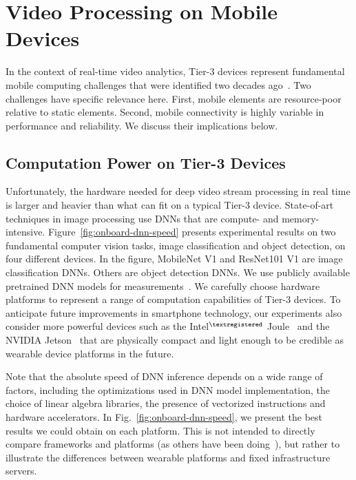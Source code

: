 \section{Video Processing on Mobile Devices}
\label{bw:challenges}

In the context of real-time video analytics, Tier-3 devices represent
fundamental mobile computing challenges that were identified two decades
ago~\cite{Satya1996}.  Two challenges have specific relevance here. First,
mobile elements are resource-poor relative to static elements.  Second, mobile
connectivity is highly variable in performance and reliability.  We discuss
their implications below.


\subsection{Computation Power on Tier-3 Devices}
\label{bw:payload}

Unfortunately, the hardware needed for deep video stream processing in real time
is larger and heavier than what can fit on a typical Tier-3 device. State-of-art
techniques in image processing use DNNs that are compute- and memory-intensive.
Figure~\ref{fig:onboard-dnn-speed} presents experimental results on two
fundamental computer vision tasks, image classification and object detection, on
four different devices. In the figure, MobileNet V1 and ResNet101 V1 are image
classification DNNs. Others are object detection DNNs. We use publicly available
pretrained DNN models for measurements~\cite{tfod2019}. We carefully choose
hardware platforms to represent a range of computation capabilities of Tier-3
devices. To anticipate future improvements in smartphone technology, our
experiments also consider more powerful devices such as the
Intel$^{\tiny\textregistered}$ Joule~\cite{Hardawar2016} and the NVIDIA
Jetson~\cite{NVIDIA2017} that are physically compact and light enough to be
credible as wearable device platforms in the future.

Note that the absolute speed of DNN inference depends on a wide range of
factors, including the optimizations used in DNN model implementation, the
choice of linear algebra libraries, the presence of vectorized instructions and
hardware accelerators. In Fig.~\ref{fig:onboard-dnn-speed}, we present the best
results we could obtain on each platform. This is not intended to directly
compare frameworks and platforms (as others have been
doing~\cite{Zhang2018pcamp}), but rather to illustrate the differences between
wearable platforms and fixed infrastructure servers. 

